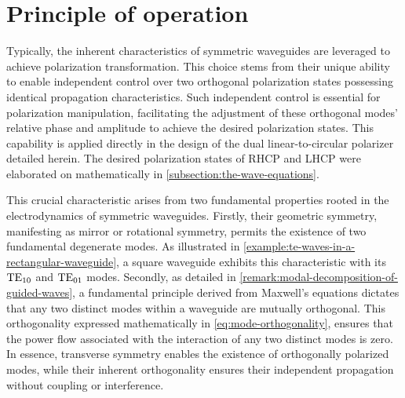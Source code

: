 \documentclass[14pt,a4paper]{ntust_report}
\begin{document}
\section{Principle of operation}
Typically, the inherent characteristics of symmetric waveguides are leveraged to achieve polarization transformation. This choice stems from their unique ability to enable independent control over two orthogonal polarization states possessing identical propagation characteristics. Such independent control is essential for polarization manipulation, facilitating the adjustment of these orthogonal modes' relative phase and amplitude to achieve the desired polarization states. This capability is applied directly in the design of the dual linear-to-circular polarizer detailed herein. The desired polarization states of RHCP and LHCP were elaborated on mathematically in \cref{subsection:the-wave-equations}.

This crucial characteristic arises from two fundamental properties rooted in the electrodynamics of symmetric waveguides. Firstly, their geometric symmetry, manifesting as mirror or rotational symmetry, permits the existence of two fundamental degenerate modes. As illustrated in \cref{example:te-waves-in-a-rectangular-waveguide}, a square waveguide exhibits this characteristic with its $\text{TE}_{10}$ and $\text{TE}_{01}$ modes. Secondly, as detailed in \cref{remark:modal-decomposition-of-guided-waves}, a fundamental principle derived from Maxwell's equations dictates that any two distinct modes within a waveguide are mutually orthogonal. This orthogonality expressed mathematically in \cref{eq:mode-orthogonality}, ensures that the power flow associated with the interaction of any two distinct modes is zero. In essence, transverse symmetry enables the existence of orthogonally polarized modes, while their inherent orthogonality ensures their independent propagation without coupling or interference.
\end{document}
